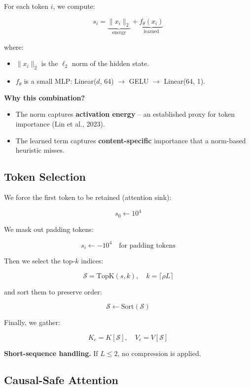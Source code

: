 For each token $i$, we compute:

\[
s_i = \underbrace{\|x_i\|_2}_{\text{energy}} + \underbrace{f_\theta(x_i)}_{\text{learned}}
\tag{4.1}
\]

where:

\begin{itemize}
\item $\|x_i\|_2$ is the $\ell_2$ norm of the hidden state.
\item $f_\theta$ is a small MLP: Linear($d$, 64) $\to$ GELU $\to$ Linear(64, 1).

\end{itemize}
\textbf{Why this combination?}

\begin{itemize}
\item The norm captures \textbf{activation energy} -- an established proxy for token
  importance (Lin et al., 2023).
\item The learned term captures \textbf{content-specific} importance that a
  norm-based heuristic misses.

\end{itemize}
\subsection{Token Selection}

We force the first token to be retained (attention sink):

\[
s_0 \leftarrow 10^4
\tag{4.2}
\]

We mask out padding tokens:

\[
s_i \leftarrow -10^4 \quad \text{for padding tokens}
\tag{4.3}
\]

Then we select the top-$k$ indices:

\[
\mathcal{S} = \text{TopK}(s, k), \quad k = \lceil \rho L \rceil
\tag{4.4}
\]

and sort them to preserve order:

\[
\mathcal{S} \leftarrow \text{Sort}(\mathcal{S})
\tag{4.5}
\]

Finally, we gather:

\[
K_c = K[\mathcal{S}], \quad V_c = V[\mathcal{S}]
\tag{4.6}
\]

\textbf{Short-sequence handling.} If $L \leq 2$, no compression is applied.

\subsection{Causal-Safe Attention}

